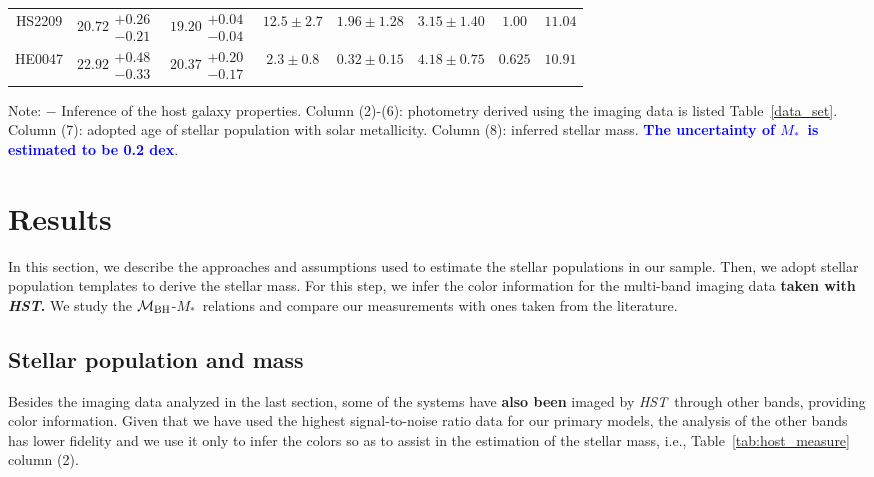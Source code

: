 \documentclass[fleqn,usenatbib]{mnras}
\newcommand{\hst}{{\it HST}}
\newcommand{\mbh}{$\mathcal M_{\rm BH}$}
\newcommand{\mstar}{{$M_*$}}
\newcommand{\blue}[1]{{\bf \textcolor{blue}{#1}}}
\begin{document}
\begin{table}
\begin{threeparttable}
\begin{tabular}{cccccccc}
HS2209 & $20.72\substack{+0.26\\-0.21}$ & $19.20\substack{+0.04\\-0.04}$ & $12.5\pm2.7$ & $1.96\pm1.28$ & $3.15\pm1.40$ & $1.00$ & $11.04$ \\
HE0047 & $22.92\substack{+0.48\\-0.33}$ & $20.37\substack{+0.20\\-0.17}$ & $2.3\pm0.8$ & $0.32\pm0.15$ & $4.18\pm0.75$ & $0.625$ & $10.91$ \\
\hline
\end{tabular}
\begin{tablenotes}
      \small
      \item Note: $-$ Inference of the host galaxy properties. Column (2)-(6): photometry derived using the imaging data is listed Table~\ref{data_set}. Column (7): adopted age of stellar population with solar metallicity. Column (8): inferred stellar mass. \blue{The uncertainty of \mstar\ is estimated to be 0.2 dex}.
\end{tablenotes}    
\end{threeparttable}
\end{table}

\section{Results}\label{sec:result}
In this section, we describe the approaches and assumptions used to estimate the stellar populations in our sample. Then, we adopt stellar population templates to derive the stellar mass. For this step, we infer the color information for the multi-band imaging data {\bf taken with \hst.}
We study the \mbh-\mstar\ relations and compare our measurements with ones taken from the literature.

\subsection{Stellar population and mass}\label{sec:mstar}
Besides the imaging data analyzed in the last section, some of the systems have {\bf also been} imaged by \hst\ through other bands, providing color information. Given that we have used the highest signal-to-noise ratio data for our primary models,  the analysis of the other bands has lower fidelity and we use it only to infer the colors so as to assist in the estimation of the stellar mass, i.e., Table~\ref{tab:host_measure} column (2).
\end{document}
